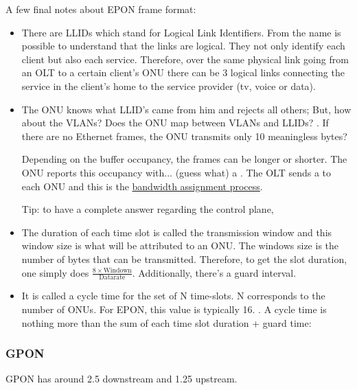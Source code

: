 A few final notes about EPON frame format:
\begin{itemize}
    \item There are LLIDs which stand for Logical Link Identifiers. From the name is possible to understand that the links are logical. They not only identify each client but also each service. Therefore, over the same physical link going from an OLT to a certain client's ONU there can be 3 logical links connecting the service in the client's home to the service provider (tv, voice or data).
    \item The ONU knows what LLID's came from him and rejects all others; But, how about the VLANs? Does the ONU map between VLANs and LLIDs? . 
    If there are no Ethernet frames, the ONU transmits only 10 meaningless bytes?

    Depending on the buffer occupancy, the frames can be longer or shorter. The ONU reports this occupancy with... (guess what) a . The OLT sends a  to each ONU and this is the \ul{bandwidth assignment process}.
    
     Tip: to have a complete answer regarding the control plane, 
    \item The duration of each time slot is called the transmission window and this window size is what will be attributed to an ONU. The windows size is the number of bytes that can be transmitted. Therefore, to get the slot duration, one simply does $\frac{8 \times \text{Windown}}{\text{Datarate}}$. Additionally, there's a guard interval.
    \item It is called a cycle time for the set of N time-slots. N corresponds to the number of ONUs. For EPON, this value is typically 16. . A cycle time is nothing more than the sum of each time slot duration + guard time:
\end{itemize}

\subsubsection*{GPON}

GPON has around 2.5 downstream and 1.25 upstream.



